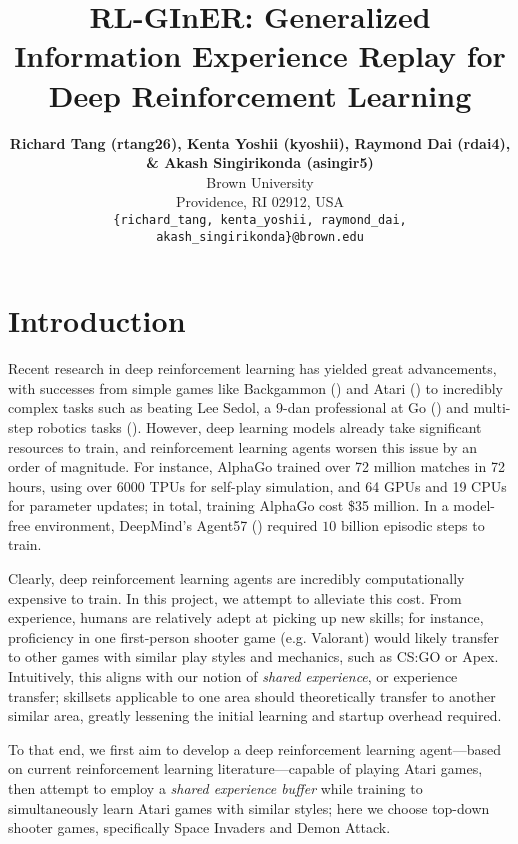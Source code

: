 \documentclass{article} %
\title{RL-GInER: Generalized Information Experience Replay for Deep Reinforcement Learning}
\author{\textbf{Richard Tang (rtang26), Kenta Yoshii (kyoshii), Raymond Dai (rdai4),
    \& Akash Singirikonda (asingir5)} \\
Brown University\\
Providence, RI 02912, USA \\
\texttt{\{richard\_tang, kenta\_yoshii, raymond\_dai, akash\_singirikonda\}@brown.edu}
}
\begin{document}
\maketitle


\section{Introduction}

Recent research in deep reinforcement learning has yielded great advancements, with successes from
simple games like Backgammon (\cite{TDGammon}) and Atari (\cite{Mnih}) to incredibly complex tasks
such as beating Lee Sedol, a 9-dan professional at Go (\cite{AlphaGo}) and multi-step robotics tasks
(\cite{ActionableModels}). However, deep learning models already take significant resources to
train, and reinforcement learning agents worsen this issue by an order of magnitude. For instance,
AlphaGo trained over 72 million matches in 72 hours, using over 6000 TPUs for self-play simulation,
and 64 GPUs and 19 CPUs for parameter updates; in total, training AlphaGo cost \$35 million. In a
model-free environment, DeepMind's Agent57 (\cite{Agent57}) required $10$ billion episodic steps to
train.

Clearly, deep reinforcement learning agents are incredibly computationally expensive to train. In
this project, we attempt to alleviate this cost. From experience, humans are relatively adept at
picking up new skills; for instance, proficiency in one first-person shooter game (e.g. Valorant)
would likely transfer to other games with similar play styles and mechanics, such as CS:GO or Apex.
Intuitively, this aligns with our notion of \textit{shared experience}, or experience transfer;
skillsets applicable to one area should theoretically transfer to another similar area, greatly
lessening the initial learning and startup overhead required.

To that end, we first aim to develop a deep reinforcement learning agent---based on current
reinforcement learning literature---capable of playing Atari games, then attempt to employ a
\textit{shared experience buffer} while training to simultaneously learn Atari games with similar
styles; here we choose top-down shooter games, specifically Space Invaders and Demon Attack.
\end{document}
